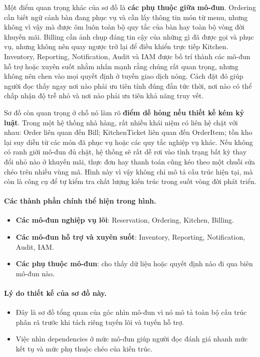 \documentclass[11pt,a4paper]{article}
\begin{document}
Một điểm quan trọng khác của sơ đồ là \textbf{các phụ thuộc giữa mô-đun}. \textsf{Ordering} cần biết ngữ cảnh bàn đang phục vụ và cần lấy thông tin món từ menu, nhưng không vì vậy mà được ôm luôn toàn bộ quy tắc của bàn hay toàn bộ vòng đời khuyến mãi. \textsf{Billing} cần ảnh chụp đáng tin cậy của những gì đã được gọi và phục vụ, nhưng không nên quay ngược trở lại để điều khiển trực tiếp \textsf{Kitchen}. \textsf{Inventory}, \textsf{Reporting}, \textsf{Notification}, \textsf{Audit} và \textsf{IAM} được bố trí thành các mô-đun hỗ trợ hoặc xuyên suốt nhằm nhấn mạnh rằng chúng rất quan trọng, nhưng không nên chen vào mọi quyết định ở tuyến giao dịch nóng. Cách đặt đó giúp người đọc thấy ngay nơi nào phải ưu tiên tính đúng đắn tức thời, nơi nào có thể chấp nhận độ trễ nhỏ và nơi nào phải ưu tiên khả năng truy vết.

Sơ đồ còn quan trọng ở chỗ nó làm rõ \textbf{điểm dễ hỏng nếu thiết kế kém kỷ luật}. Trong một hệ thống nhà hàng, rất nhiều khái niệm có liên hệ chặt với nhau: \textsf{Order} liên quan đến \textsf{Bill}; \textsf{KitchenTicket} liên quan đến \textsf{OrderItem}; tồn kho lại suy diễn từ các món đã phục vụ hoặc các quy tắc nghiệp vụ khác. Nếu không có ranh giới mô-đun đủ chặt, hệ thống sẽ rất dễ rơi vào tình trạng bất kỳ thay đổi nhỏ nào ở khuyến mãi, thực đơn hay thanh toán cũng kéo theo một chuỗi sửa chéo trên nhiều vùng mã. Hình này vì vậy không chỉ mô tả cấu trúc hiện tại, mà còn là công cụ để tự kiểm tra chất lượng kiến trúc trong suốt vòng đời phát triển.

\paragraph{Các thành phần chính thể hiện trong hình.}
\begin{itemize}
  \item \textbf{Các mô-đun nghiệp vụ lõi}: \textsf{Reservation}, \textsf{Ordering}, \textsf{Kitchen}, \textsf{Billing}.
  \item \textbf{Các mô-đun hỗ trợ và xuyên suốt}: \textsf{Inventory}, \textsf{Reporting}, \textsf{Notification}, \textsf{Audit}, \textsf{IAM}.
  \item \textbf{Các phụ thuộc mô-đun}: cho thấy dữ liệu hoặc quyết định nào đi qua biên mô-đun nào.
\end{itemize}

\paragraph{Lý do thiết kế của sơ đồ này.}
\begin{itemize}
  \item Đây là sơ đồ tổng quan của góc nhìn mô-đun vì nó mô tả toàn bộ cấu trúc phân rã trước khi tách riêng tuyến lõi và tuyến hỗ trợ.
  \item Việc nhìn dependencies ở mức mô-đun giúp người đọc đánh giá nhanh mức kết tụ và mức phụ thuộc chéo của kiến trúc.
\end{itemize}
\end{document}
